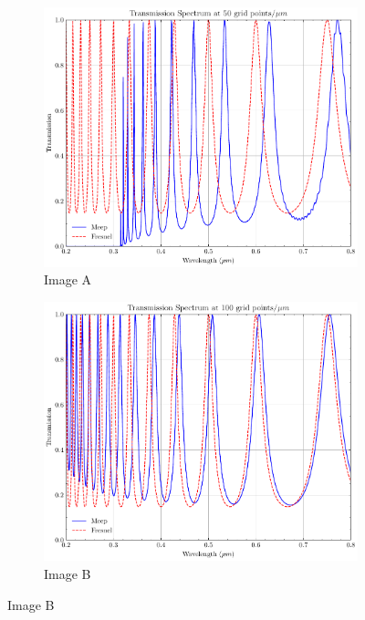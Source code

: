 \begin{figure}[H]
  \centering
  \begin{subfigure}[b]{0.45\textwidth}
      \centering
      \includegraphics[width=\textwidth]{obrazky-figures/Transmission_eps25.0_h0.3_r50.pdf}
      \caption{Image A}
      \label{fig:subfig1}
  \end{subfigure}
  \hfill
  \begin{subfigure}[b]{0.45\textwidth}
      \centering
      \includegraphics[width=\textwidth]{obrazky-figures/Transmission_eps25.0_h0.3_r100.pdf}
      \caption{Image B}
      \label{fig:subfig2}
  \end{subfigure}
  

\end{figure}

